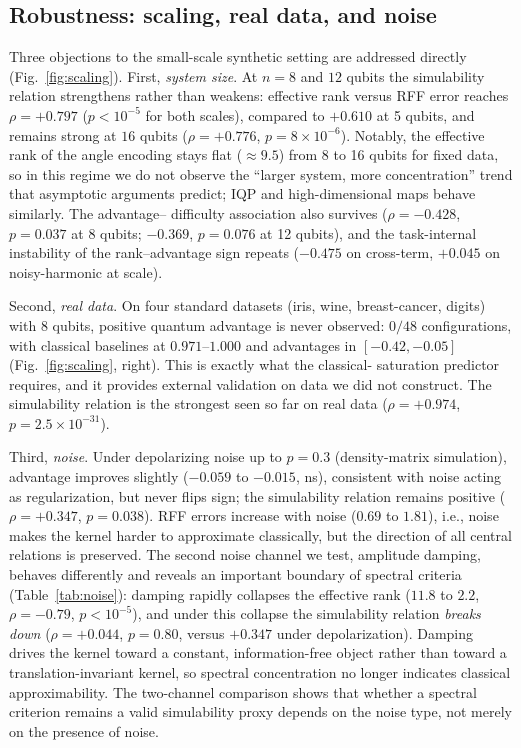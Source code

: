 \documentclass[a4paper,unpublished,onecolumn,nopdfoutputerror,12pt]{quantumarticle}
\begin{document}
\subsection{Robustness: scaling, real data, and noise}
\label{sec:robustness}

Three objections to the small-scale synthetic setting are addressed directly (Fig.~\ref{fig:scaling}).
First, \emph{system size}. At $n=8$ and $12$ qubits the simulability relation strengthens
rather than weakens: effective rank versus RFF error reaches $\rho=+0.797$ ($p<10^{-5}$
for both scales), compared to $+0.610$ at 5 qubits, and remains strong at $16$ qubits
($\rho=+0.776$, $p=8\times10^{-6}$). Notably, the effective rank of the
angle encoding stays flat ($\approx9.5$) from 8 to 16 qubits for fixed data, so in this
regime we do not observe the ``larger system, more concentration'' trend that asymptotic
arguments predict; IQP and high-dimensional maps behave similarly. The advantage--
difficulty association also survives ($\rho=-0.428$, $p=0.037$ at 8 qubits; $-0.369$,
$p=0.076$ at 12 qubits), and the task-internal instability of the rank--advantage sign
repeats ($-0.475$ on cross-term, $+0.045$ on noisy-harmonic at scale).

Second, \emph{real data}. On four standard datasets (iris, wine, breast-cancer,
digits) with 8 qubits, positive quantum advantage is never observed: $0/48$
configurations, with classical baselines at $0.971$--$1.000$ and advantages in
$[-0.42,-0.05]$ (Fig.~\ref{fig:scaling}, right). This is exactly what the classical-
saturation predictor requires, and it provides external validation on data we did not
construct. The simulability relation is the strongest seen so far on real data
($\rho=+0.974$, $p=2.5\times10^{-31}$).

Third, \emph{noise}. Under depolarizing noise up to $p=0.3$ (density-matrix simulation),
advantage improves slightly ($-0.059$ to $-0.015$, ns), consistent with noise acting as
regularization, but never flips sign; the simulability relation remains positive
($\rho=+0.347$, $p=0.038$). RFF errors increase with noise ($0.69$ to $1.81$), i.e.,
noise makes the kernel harder to approximate classically, but the direction of all
central relations is preserved. The second noise channel we test, amplitude damping,
behaves differently and reveals an important boundary of spectral criteria
(Table~\ref{tab:noise}): damping rapidly collapses the effective rank ($11.8$ to $2.2$,
$\rho=-0.79$, $p<10^{-5}$), and under this collapse the simulability relation
\emph{breaks down} ($\rho=+0.044$, $p=0.80$, versus $+0.347$ under depolarization).
Damping drives the kernel toward a constant, information-free object rather than toward
a translation-invariant kernel, so spectral concentration no longer indicates classical
approximability. The two-channel comparison shows that whether a spectral criterion
remains a valid simulability proxy depends on the noise type, not merely on the
presence of noise.
\end{document}

